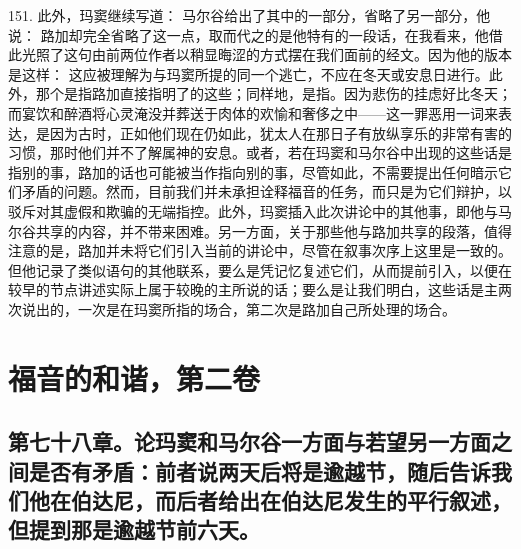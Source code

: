 151. 此外，玛窦继续写道： 马尔谷给出了其中的一部分，省略了另一部分，他说： 路加却完全省略了这一点，取而代之的是他特有的一段话，在我看来，他借此光照了这句由前两位作者以稍显晦涩的方式摆在我们面前的经文。因为他的版本是这样： 这应被理解为与玛窦所提的同一个逃亡，不应在冬天或安息日进行。此外，那个是指路加直接指明了的这些；同样地，是指。因为悲伤的挂虑好比冬天；而宴饮和醉酒将心灵淹没并葬送于肉体的欢愉和奢侈之中——这一罪恶用一词来表达，是因为古时，正如他们现在仍如此，犹太人在那日子有放纵享乐的非常有害的习惯，那时他们并不了解属神的安息。或者，若在玛窦和马尔谷中出现的这些话是指别的事，路加的话也可能被当作指向别的事，尽管如此，不需要提出任何暗示它们矛盾的问题。然而，目前我们并未承担诠释福音的任务，而只是为它们辩护，以驳斥对其虚假和欺骗的无端指控。此外，玛窦插入此次讲论中的其他事，即他与马尔谷共享的内容，并不带来困难。另一方面，关于那些他与路加共享的段落，值得注意的是，路加并未将它们引入当前的讲论中，尽管在叙事次序上这里是一致的。但他记录了类似语句的其他联系，要么是凭记忆复述它们，从而提前引入，以便在较早的节点讲述实际上属于较晚的主所说的话；要么是让我们明白，这些话是主两次说出的，一次是在玛窦所指的场合，第二次是路加自己所处理的场合。\par



\section{福音的和谐，第二卷}


\subsection{第七十八章。论玛窦和马尔谷一方面与若望另一方面之间是否有矛盾：前者说两天后将是逾越节，随后告诉我们他在伯达尼，而后者给出在伯达尼发生的平行叙述，但提到那是逾越节前六天。}

